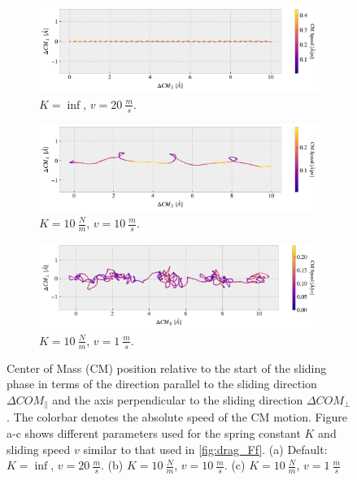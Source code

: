 \begin{figure}[H]
  \centering
  \begin{subfigure}[t]{0.85\textwidth}
    \centering
    \includegraphics[width=\textwidth]{figures/baseline/COM_path_K0.pdf}
    \caption{$K = \inf$, $v = \SI{20}{\frac{m}{s}}$.}
    \label{fig:CM_path_def}
  \end{subfigure}
  \hfill
  \begin{subfigure}[t]{0.85\textwidth}
    \centering
    \includegraphics[width=\textwidth]{figures/baseline/COM_path_K10_v10.pdf}
    \caption{$K = \SI{10}{\frac{N}{m}}$, $v = \SI{10}{\frac{m}{s}}$.}
    \label{fig:CM_path_K10_v10}
  \end{subfigure}
  \begin{subfigure}[t]{0.85\textwidth}
    \centering
    \includegraphics[width=\textwidth]{figures/baseline/COM_path_K10_v1.pdf}
    \caption{$K = \SI{10}{\frac{N}{m}}$, $v = \SI{1}{\frac{m}{s}}$.}
    \label{fig:CM_path_K10_v1}
  \end{subfigure}
  \caption{Center of Mass (\acrshort{CM}) position relative to the start of the sliding phase in terms of the direction parallel to the sliding direction $\Delta COM_{\parallel}$ and the axis perpendicular to the sliding direction $\Delta COM_{\perp}$. The colorbar denotes the absolute speed of the \acrshort{CM} motion. Figure a-c shows different parameters used for the spring constant $K$ and sliding speed $v$ similar to that used in \cref{fig:drag_Ff}. (a) Default: $K = \inf$, $v = \SI{20}{\frac{m}{s}}$. (b) $K = \SI{10}{\frac{N}{m}}$, $v = \SI{10}{\frac{m}{s}}$. (c) $K = \SI{10}{\frac{N}{m}}$, $v = \SI{1}{\frac{m}{s}}$ }
  \label{fig:CM_path}
\end{figure}


